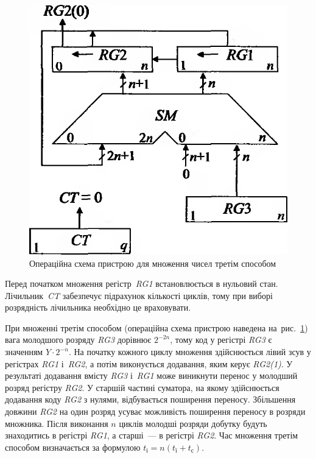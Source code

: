 \documentclass[a4paper,oneside,DIV=12,12pt]{scrartcl}
\newcommand{\schel}[1]{\textit{#1}}
\begin{document}
\begin{solution}
		\begin{figure}[!htbp]
		\centering
			\includegraphics[height = 10\baselineskip]{assets/task-1-01-multiplication-3rd-method-operation-scheme}
		\caption{Операційна схема пристрою для множення чисел третім способом}
		\label{fig:multiplication-3rd-method-operation-scheme}
		\end{figure}
		
		Перед початком множення регістр~\schel{RG1} встановлюється в нульовий стан. Лічильник~\schel{CT} забезпечує підрахунок кількості циклів, тому при виборі розрядність лічильника необхідно це враховувати.
		
		При множенні третім способом (операційна схема пристрою наведена на~рис.~\ref{fig:multiplication-3rd-method-operation-scheme}) вага молодшого розряду \schel{RG3} дорівнює $2^{-2n}$, тому код у регістрі \schel{RG3} є значенням $Y \cdot 2^{-n}$. На початку кожного циклу множення здійснюється лівий зсув у регістрах \schel{RG1} і~\schel{RG2}, а потім виконується додавання, яким керує \schel{RG2(1)}. У результаті додавання вмісту \schel{RG3} і~\schel{RG1} може виникнути перенос у молодший розряд регістру \schel{RG2}. У старшій частині суматора, на якому здійснюється додавання коду \schel{RG2} з нулями, відбувається поширення переносу. Збільшення довжини \schel{RG2} на один розряд усуває можливість поширення переносу в розряди множника. Після виконання $n$ циклів молодші розряди добутку будуть знаходитись в регістрі \schel{RG1}, а старші~— в регістрі \schel{RG2}. Час множення третім способом визначається за формулою $t_{\text{і}} = n \left( t_{\text{ї}} + t_{\text{с}} \right)$.
	\end{solution}
	
\end{document}
